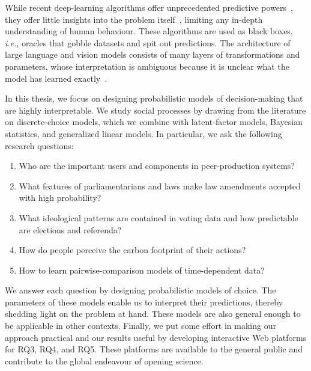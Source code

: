 While recent deep-learning algorithms offer unprecedented predictive powers~\citep{lecun2015deep}, they offer little insights into the problem itself~\citep{rudin2019stop}, limiting any in-depth understanding of human behaviour.
These algorithms are used as black boxes, \textit{i.e.}, oracles that gobble datasets and spit out predictions.
The architecture of large language and vision models consists of many layers of transformations and parameters, whose interpretation is ambiguous because it is unclear what the model has learned exactly~\citep{fong2017interpretable,guidotti2018survey,olah2020zoom,hilton2020understanding}.

In this thesis, we focus on designing probabilistic models of decision-making that are highly interpretable.
We study social processes by drawing from the literature on discrete-choice models, which we combine with latent-factor models, Bayesian statistics, and generalized linear models.
In particular, we ask the following research questions:
\begin{enumerate}[
		leftmargin=1.5cm,
		topsep=0cm,
		parsep=0.0pt,
		itemsep=1.5pt,
		label=\textbf{RQ\arabic*}
	]
	\item Who are the important users and components in peer-production systems?
	\item What features of parliamentarians and laws make law amendments accepted with high probability?
	\item What ideological patterns are contained in voting data and how predictable are elections and referenda?
	\item How do people perceive the carbon footprint of their actions?
	\item How to learn pairwise-comparison models of time-dependent data?
\end{enumerate}
We answer each question by designing probabilistic models of choice.
The parameters of these models enable us to interpret their predictions, thereby shedding light on the problem at hand.
These models are also general enough to be applicable in other contexts.
Finally, we put some effort in making our approach practical and our results useful by developing interactive Web platforms for RQ3, RQ4, and RQ5.
These platforms are available to the general public and contribute to the global endeavour of opening science.
